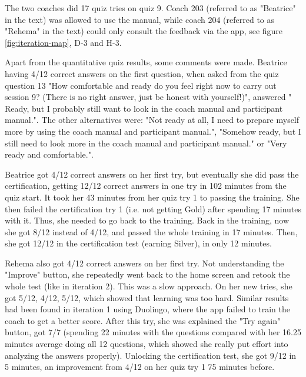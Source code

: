   \clearpage

  The two coaches did 17 quiz tries on quiz 9. Coach 203 (referred to as "Beatrice" in the text) was allowed to use the manual, while coach 204 (referred to as "Rehema" in the text) could only consult the feedback via the app, see figure \ref{fig:iteration-map}, D-3 and H-3.

  Apart from the quantitative quiz results, some comments were made. Beatrice having 4/12 correct answers on the first question, when asked from the quiz question 13 "How comfortable and ready do you feel right now to carry out session 9? (There is no right answer, just be honest with yourself!)", answered " Ready, but I probably still want to look in the coach manual and participant manual.". The other alternatives were: "Not ready at all, I need to prepare myself more by using the coach manual and participant manual.", "Somehow ready, but I still need to look more in the coach manual and participant manual." or "Very ready and comfortable.".

  Beatrice got 4/12 correct answers on her first try, but eventually she did pass the certification, getting 12/12 correct answers in one try in 102 minutes from the quiz start. It took her 43 minutes from her quiz try 1 to passing the training. She then failed the certification try 1 (i.e. not getting Gold) after spending 17 minutes with it. Thus, she needed to go back to the training. Back in the training, now she got 8/12 instead of 4/12, and passed the whole training in 17 minutes. Then, she got 12/12 in the certification test (earning Silver), in only 12 minutes.

  Rehema also got 4/12 correct answers on her first try. Not understanding the "Improve" button, she repeatedly went back to the home screen and retook the whole test (like in iteration 2). This was a slow approach. On her new tries, she got 5/12, 4/12, 5/12, which showed that learning was too hard. Similar results had been found in iteration 1 using Duolingo, where the app failed to train the coach to get a better score. After this try, she was explained the "Try again" button, got 7/7 (spending 22 minutes with the questions compared with her 16.25 minutes average doing all 12 questions, which showed she really put effort into analyzing the answers properly). Unlocking the certification test, she got 9/12 in 5 minutes, an improvement from 4/12 on her quiz try 1 75 minutes before.

